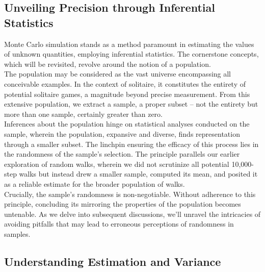 \documentclass[12pt]{article}
\begin{document}
    \subsection{Unveiling Precision through Inferential Statistics}
    Monte Carlo simulation stands as a method paramount in estimating the values of unknown quantities, employing inferential statistics. The cornerstone concepts, which will be revisited, revolve around the notion of a population.\\
    The population may be considered as the vast universe encompassing all conceivable examples. In the context of solitaire, it constitutes the entirety of potential solitaire games, a magnitude beyond precise measurement. From this extensive population, we extract a sample, a proper subset – not the entirety but more than one sample, certainly greater than zero.\\
    Inferences about the population hinge on statistical analyses conducted on the sample, wherein the population, expansive and diverse, finds representation through a smaller subset. The linchpin ensuring the efficacy of this process lies in the randomness of the sample's selection. The principle parallels our earlier exploration of random walks, wherein we did not scrutinize all potential 10,000-step walks but instead drew a smaller sample, computed its mean, and posited it as a reliable estimate for the broader population of walks.\\
    Crucially, the sample's randomness is non-negotiable. Without adherence to this principle, concluding its mirroring the properties of the population becomes untenable. As we delve into subsequent discussions, we'll unravel the intricacies of avoiding pitfalls that may lead to erroneous perceptions of randomness in samples.
    \subsection{Understanding Estimation and Variance}
\end{document}

